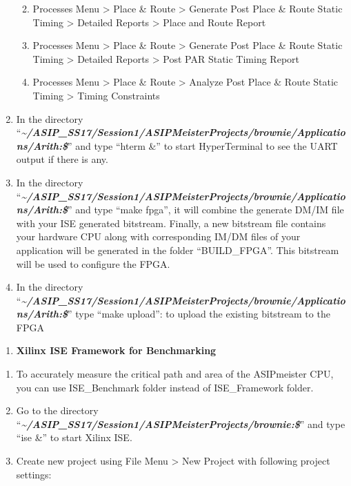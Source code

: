\documentclass[
]{article}
\begin{document}
\begin{enumerate}
  \begin{enumerate}
  \def\labelenumii{\alph{enumii}.}
  \item
    Processes Menu \textgreater{} Place \& Route \textgreater{} Generate
    Post Place \& Route Static Timing \textgreater{} Detailed Reports
    \textgreater{} Place and Route Report
  \item
    Processes Menu \textgreater{} Place \& Route \textgreater{} Generate
    Post Place \& Route Static Timing \textgreater{} Detailed Reports
    \textgreater{} Post PAR Static Timing Report
  \item
    Processes Menu \textgreater{} Place \& Route \textgreater{} Analyze
    Post Place \& Route Static Timing \textgreater{} Timing Constraints
  \end{enumerate}
\item
  In the directory
  ``\emph{\textbf{\textasciitilde/ASIP\_SS17/Session1/ASIPMeisterProjects/brownie/Applications/Arith:\$}}''
  and type ``hterm \&'' to start HyperTerminal to see the UART output if
  there is any.
\item
  In the directory
  ``\emph{\textbf{\textasciitilde/ASIP\_SS17/Session1/ASIPMeisterProjects/brownie/Applications/Arith:\$}}''
  and type ``make fpga'', it will combine the generate DM/IM file with
  your ISE generated bitstream. Finally, a new bitstream file contains
  your hardware CPU along with corresponding IM/DM files of your
  application will be generated in the folder ``BUILD\_FPGA''. This
  bitstream will be used to configure the FPGA.
\item
  In the directory
  ``\emph{\textbf{\textasciitilde/ASIP\_SS17/Session1/ASIPMeisterProjects/brownie/Applications/Arith:\$}}''
  type ``make upload'': to upload the existing bitstream to the FPGA
\end{enumerate}

\begin{enumerate}
\def\labelenumi{\Alph{enumi}.}
\setcounter{enumi}{1}
\item
  \textbf{Xilinx ISE Framework for Benchmarking}
\end{enumerate}

\begin{enumerate}
\def\labelenumi{\arabic{enumi}.}
\setcounter{enumi}{17}
\item
  To accurately measure the critical path and area of the ASIPmeister
  CPU, you can use ISE\_Benchmark folder instead of ISE\_Framework
  folder.
\item
  Go to the directory
  ``\emph{\textbf{\textasciitilde/ASIP\_SS17/Session1/ASIPMeisterProjects/brownie:\$}}''
  and type ``ise \&'' to start Xilinx ISE.
\item
  Create new project using File Menu \textgreater{} New Project with
  following project settings:
\end{enumerate}
\end{document}
